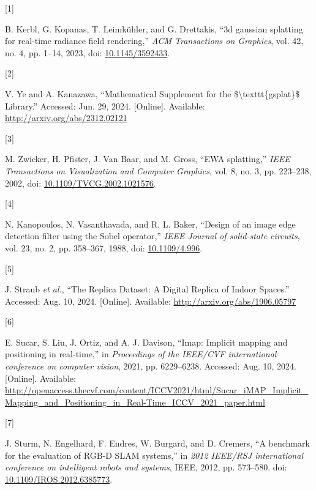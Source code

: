 \documentclass[twocolumn]{article} %
\newlength{\cslhangindent}
\newlength{\csllabelwidth}
\newenvironment{CSLReferences}[2] %
{\begin{list}{}{%
  \setlength{\itemindent}{0pt}
  \setlength{\leftmargin}{0pt}
  \setlength{\parsep}{0pt}
  \ifodd #1
  \setlength{\leftmargin}{\cslhangindent}
  \setlength{\itemindent}{-1\cslhangindent}
  \fi
  \setlength{\itemsep}{#2\baselineskip}}}
{\end{list}}
\newcommand{\CSLLeftMargin}[1]{\parbox[t]{\csllabelwidth}{\strut#1\strut}}
\newcommand{\CSLRightInline}[1]{\parbox[t]{\linewidth - \csllabelwidth}{\strut#1\strut}}
\begin{document}
\label{refs}
\begin{CSLReferences}{0}{0}
\CSLLeftMargin{{[}1{]} }%
\CSLRightInline{B. Kerbl, G. Kopanas, T. Leimkühler, and G. Drettakis,
{``3d gaussian splatting for real-time radiance field rendering,''}
\emph{ACM Transactions on Graphics}, vol. 42, no. 4, pp. 1--14, 2023,
doi: \href{https://doi.org/10.1145/3592433}{10.1145/3592433}.}

\CSLLeftMargin{{[}2{]} }%
\CSLRightInline{V. Ye and A. Kanazawa, {``Mathematical {Supplement} for
the \$\textbackslash texttt\{gsplat\}\$ {Library}.''} Accessed: Jun. 29,
2024. {[}Online{]}. Available: \url{http://arxiv.org/abs/2312.02121}}

\CSLLeftMargin{{[}3{]} }%
\CSLRightInline{M. Zwicker, H. Pfister, J. Van Baar, and M. Gross,
{``{EWA} splatting,''} \emph{IEEE Transactions on Visualization and
Computer Graphics}, vol. 8, no. 3, pp. 223--238, 2002, doi:
\href{https://doi.org/10.1109/TVCG.2002.1021576}{10.1109/TVCG.2002.1021576}.}

\CSLLeftMargin{{[}4{]} }%
\CSLRightInline{N. Kanopoulos, N. Vasanthavada, and R. L. Baker,
{``Design of an image edge detection filter using the {Sobel}
operator,''} \emph{IEEE Journal of solid-state circuits}, vol. 23, no.
2, pp. 358--367, 1988, doi:
\href{https://doi.org/10.1109/4.996}{10.1109/4.996}.}

\CSLLeftMargin{{[}5{]} }%
\CSLRightInline{J. Straub \emph{et al.}, {``The {Replica Dataset}: {A
Digital Replica} of {Indoor Spaces}.''} Accessed: Aug. 10, 2024.
{[}Online{]}. Available: \url{http://arxiv.org/abs/1906.05797}}

\CSLLeftMargin{{[}6{]} }%
\CSLRightInline{E. Sucar, S. Liu, J. Ortiz, and A. J. Davison, {``Imap:
{Implicit} mapping and positioning in real-time,''} in \emph{Proceedings
of the {IEEE}/{CVF} international conference on computer vision}, 2021,
pp. 6229--6238. Accessed: Aug. 10, 2024. {[}Online{]}. Available:
\url{http://openaccess.thecvf.com/content/ICCV2021/html/Sucar_iMAP_Implicit_Mapping_and_Positioning_in_Real-Time_ICCV_2021_paper.html}}

\CSLLeftMargin{{[}7{]} }%
\CSLRightInline{J. Sturm, N. Engelhard, F. Endres, W. Burgard, and D.
Cremers, {``A benchmark for the evaluation of {RGB-D SLAM} systems,''}
in \emph{2012 {IEEE}/{RSJ} international conference on intelligent
robots and systems}, IEEE, 2012, pp. 573--580. doi:
\href{https://doi.org/10.1109/IROS.2012.6385773}{10.1109/IROS.2012.6385773}.}

\end{CSLReferences}
\end{document}
